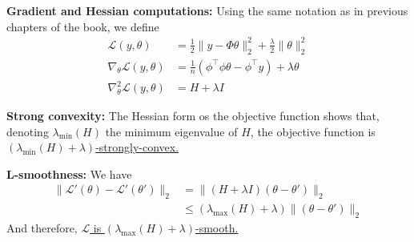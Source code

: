 \begin{questions}
\begin{solution}
\begin{parts}
     \textbf{Gradient and Hessian computations: } Using the same notation as in previous chapters of the book, we define 
     $$
     \begin{aligned}
         \mathcal{L}(y, \theta) &= \frac{1}{2} \|y - \Phi \theta \|_2^2 + \frac{\lambda}{2} \| \theta \|_2^2 \\
         \nabla_{\theta} \mathcal{L}(y, \theta) &= \frac{1}{n} (\phi^\top \phi \theta - \phi^\top y) + \lambda \theta \\
         \nabla_{\theta}^2 \mathcal{L}(y, \theta) &= H + \lambda I
     \end{aligned}
     $$

    \textbf{Strong convexity:} The Hessian form os the objective function shows that, denoting $\lambda_{\min}(H)$ the minimum eigenvalue of $H$, the objective function is \uline{$\left( \lambda_{\min}(H) + \lambda  \right)$-strongly-convex.}

    \textbf{L-smoothness:} We have
    $$
    \begin{aligned}
            \|\mathcal{L}'(\theta) - \mathcal{L}'(\theta')\|_2 &= \| (H+\lambda I) (\theta-\theta') \|_2 \\
            &\leq (\lambda_{\max}(H) + \lambda) \|(\theta-\theta') \|_2
        \end{aligned}
    $$
    And therefore, \uline{$\mathcal{L}$ is $(\lambda_{\max}(H) + \lambda)$-smooth.}
    \end{parts}

        
    \end{solution}
\end{questions}